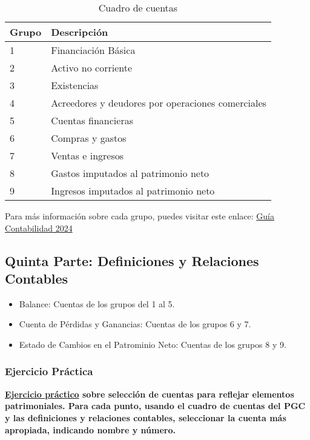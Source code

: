 \documentclass[a4paper,12pt]{article}
\begin{document}
    \begin{table}[H]
        \centering
        \begin{tabular}{|p{3cm}|p{12cm}|}
        \hline
        \textbf{Grupo} & \textbf{Descripción} \\ \hline
        1 & Financiación Básica \\ \hline
        2 & Activo no corriente \\ \hline
        3 & Existencias \\ \hline
        4 & Acreedores y deudores por operaciones comerciales \\ \hline
        5 & Cuentas financieras \\ \hline
        6 & Compras y gastos \\ \hline
        7 & Ventas e ingresos \\ \hline
        8 & Gastos imputados al patrimonio neto \\ \hline
        9 & Ingresos imputados al patrimonio neto \\ \hline
        \end{tabular}
        \caption{Cuadro de cuentas}
    \end{table}

    Para más información sobre cada grupo, puedes visitar este enlace: \href{https://mundocontabilidad.es/plan-general-de-contabilidad/cuadro-de-cuentas/}{Guía Contabilidad 2024}

    \subsection{Quinta Parte: Definiciones y Relaciones Contables}

    \begin{itemize}
        \item Balance: Cuentas de los grupos del 1 al 5.
        \item Cuenta de Pérdidas y Ganancias: Cuentas de los grupos 6 y 7.
        \item Estado de Cambios en el Patrominio Neto: Cuentas de los grupos 8 y 9.
    \end{itemize}

    \subsubsection*{Ejercicio Práctica}
    \textbf{\underline{Ejercicio práctico} sobre selección de cuentas para reflejar elementos patrimoniales. Para cada punto, usando el cuadro de cuentas del PGC y las definiciones y relaciones contables, seleccionar la cuenta más apropiada, indicando nombre y número.}
\end{document}
